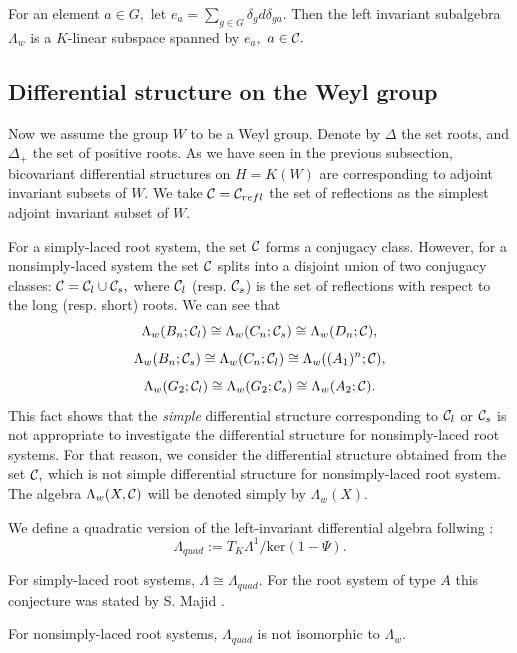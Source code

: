 For an element $a\in G,$ let $e_a=\sum_{g\in G} \delta_g 
d\delta_{ga}.$ Then the left invariant subalgebra 
$\Lambda_w$ is a $K$-linear subspace spanned by $e_a,$ 
$a\in {\cal C}.$ 
\subsection{Differential structure on the Weyl group}
Now we assume the group $W$ to be a Weyl group. Denote by 
$\Delta$ the set roots, and $\Delta_+$ the set of positive 
roots. As we have seen in the previous subsection, 
bicovariant differential structures on $H=K(W)$ 
are corresponding to adjoint invariant subsets of $W.$ 
We take ${\cal C}={\cal C}_{refl}$ the set of reflections 
as the simplest adjoint invariant subset of $W.$ 
\begin{rem}
{\rm For a simply-laced root system, the set ${\cal C}$ forms a 
conjugacy class. However, for a nonsimply-laced system 
the set ${\cal C}$ splits 
into a disjoint union of two conjugacy classes: 
${\cal C} = {\cal C}_l \cup {\cal C}_s,$ where 
${\cal C}_l$ (resp. ${\cal C}_s$) is the set of 
reflections with respect to the long (resp. short) roots. 
We can see that 
\[ \Lambda_w(B_n;{\cal C}_l) \cong  \Lambda_w(C_n;{\cal C}_s)
\cong \Lambda_w(D_n;{\cal C}), \] 
\[ \Lambda_w(B_n;{\cal C}_s) \cong  \Lambda_w(C_n;{\cal C}_l)
\cong \Lambda_w((A_1)^n;{\cal C}) , \] 
\[ \Lambda_w(G_2;{\cal C}_l) \cong  \Lambda_w(G_2;{\cal C}_s)
\cong  \Lambda_w(A_2;{\cal C}). \] 
This fact shows that the {\it simple} differential 
structure corresponding to ${\cal C}_l$ or ${\cal C}_s$ is 
not appropriate to investigate the differential structure 
for nonsimply-laced root systems. For that reason, we 
consider the differential structure obtained from the set 
${\cal C},$ which is not simple differential structure for 
nonsimply-laced root system. The algebra $\Lambda_w(X,{\cal C})$ 
will be denoted simply by $\Lambda_w(X).$ }
\end{rem}
We define a quadratic version of the left-invariant differential 
algebra follwing \cite{Maj}: 
\[ \Lambda_{quad} := T_K \Lambda^1 / \textrm{ker}(1- \Psi). \] 
\begin{conj}
{\rm  For simply-laced root systems, 
$\Lambda \cong \Lambda_{quad}.$ 
For the root system of type $A$ this conjecture was stated by 
S. Majid \cite{Maj}.} 
\end{conj}
\begin{rem} {\rm 
For nonsimply-laced root systems, $\Lambda_{quad}$ is not 
isomorphic to $\Lambda_w.$} 
\end{rem} 
